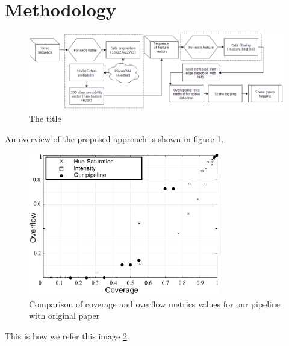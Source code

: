 \section{Methodology}\label{sec:METHOD}



\begin{figure}[ht]
	\normalsize
    \centering
    \includegraphics[width=6.3in]{images/Fig1.png}
    \caption{The title}
    \label{fig:workflow}
\end{figure}

An overview of the proposed approach is shown in figure \ref{fig:workflow}.

\begin{figure}
    \includegraphics[width=3.3in]{images/Fig2.png}
    \caption{Comparison of coverage and overflow metrics values for our pipeline with original paper}
    \label{fig:cov-over}
\end{figure}

This is how we refer this image \ref{fig:cov-over}.


